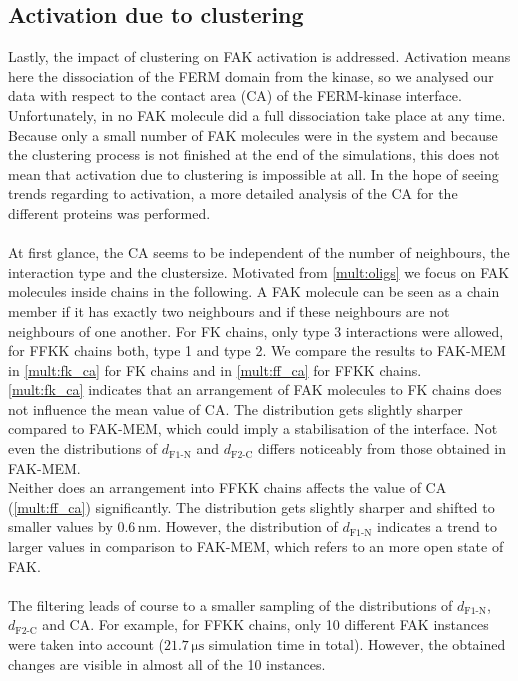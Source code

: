 \subsection{Activation due to clustering}
Lastly, the impact of clustering on FAK activation is addressed. Activation means here the dissociation of the FERM domain from the kinase, so we analysed our data with respect to the contact area (CA) of the FERM-kinase interface.\\
Unfortunately, in no FAK molecule did a full dissociation take place at any time. Because only a small number of FAK molecules were in the system and because the clustering process is not finished at the end of the simulations, this does not mean that activation due to clustering is impossible at all. In the hope of seeing trends regarding to activation, a more detailed analysis of the CA for the different proteins was performed.\\
\\
At first glance, the CA seems to be independent of the number of neighbours, the interaction type and the clustersize. Motivated from \autoref{mult:oligs} we focus on FAK molecules inside chains in the following. A FAK molecule can be seen as a chain member if it has exactly two neighbours and if these neighbours are not neighbours of one another. For FK chains, only type 3 interactions were allowed, for FFKK chains both, type 1 and type 2. We compare the results to FAK-MEM in \autoref{mult:fk_ca} for FK chains and in \autoref{mult:ff_ca} for FFKK chains.\\
\autoref{mult:fk_ca} indicates that an arrangement of FAK molecules to FK chains does not influence the mean value of CA. The distribution gets slightly sharper compared to FAK-MEM, which could imply a stabilisation of the interface. Not even the distributions of $d_\text{F1-N}$ and $d_\text{F2-C}$ differs noticeably from those obtained in FAK-MEM.\\
Neither does an arrangement into FFKK chains affects the value of CA (\autoref{mult:ff_ca}) significantly. The distribution gets slightly sharper and shifted to smaller values by $0.6\,\si{\nano\metre}$. However, the distribution of $d_\text{F1-N}$ indicates a trend to larger values in comparison to FAK-MEM, which refers to an more open state of FAK.\\
\\
The filtering leads of course to a smaller sampling of the distributions of $d_\text{F1-N}$, $d_\text{F2-C}$ and CA. For example, for FFKK chains, only 10 different FAK instances were taken into account ($21.7\,\si{\micro\second}$ simulation time in total). However, the obtained changes are visible in almost all of the 10 instances.
